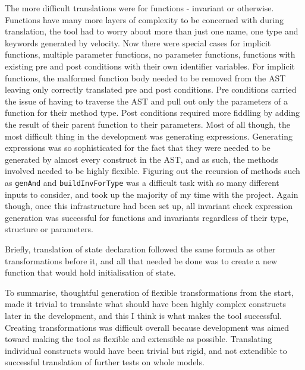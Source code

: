 The more difficult translations were for functions - invariant or otherwise. Functions have many more layers of complexity to be concerned with during translation, the tool had to worry about more than just one name, one type and keywords generated by velocity. Now there were special cases for implicit functions, multiple parameter functions, no parameter functions, functions with existing pre and post conditions with their own identifier variables. For implicit functions, the malformed function body needed to be removed from the AST leaving only correctly translated pre and post conditions. Pre conditions carried the issue of having to traverse the AST and pull out only the parameters of a function for their method type. Post conditions required more fiddling by adding the result of their parent function to their parameters. Most of all though, the most difficult thing in the development was generating expressions. Generating expressions was so sophisticated for the fact that they were needed to be generated by almost every construct in the AST, and as such, the methods involved needed to be highly flexible. Figuring out the recursion of methods such as \lstinline[language=Isabelle]{genAnd} and \lstinline[language=Isabelle]{buildInvForType} was a difficult task with so many different inputs to consider, and took up the majority of my time with the project. Again though, once this infrastructure had been set up, all invariant check expression generation was successful for functions and invariants regardless of their type, structure or parameters.

Briefly, translation of state declaration followed the same formula as other transformations before it, and all that needed be done was to create a new function that would hold initialisation of state. 

To summarise, thoughtful generation of flexible transformations from the start, made it trivial to translate what should have been highly complex constructs later in the development, and this I think is what makes the tool successful. Creating transformations was difficult overall because development was aimed toward making the tool as flexible and extensible as possible. Translating individual constructs would have been trivial but rigid, and not extendible to successful translation of further tests on whole models.


